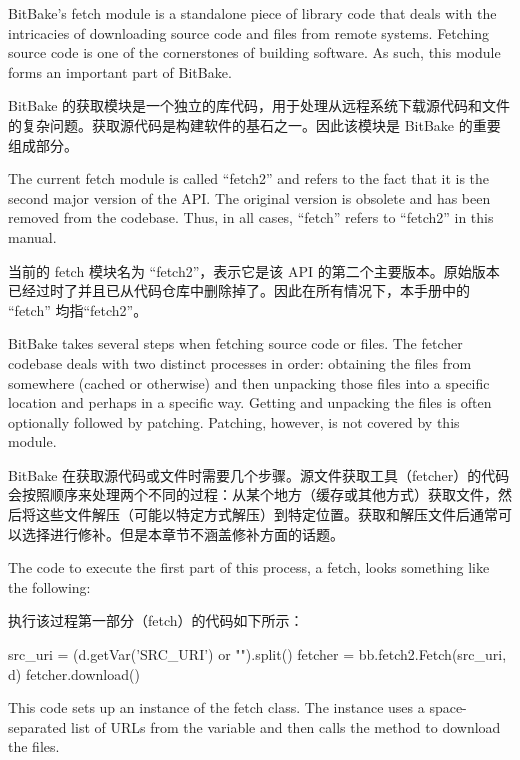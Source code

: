 
BitBake's fetch module is a standalone piece of library code that deals with the intricacies of downloading source code and files from remote systems. Fetching source code is one of the cornerstones of building software. As such, this module forms an important part of BitBake.

BitBake 的获取模块是一个独立的库代码，用于处理从远程系统下载源代码和文件的复杂问题。获取源代码是构建软件的基石之一。因此该模块是 BitBake 的重要组成部分。

The current fetch module is called ``fetch2'' and refers to the fact that it is the second major version of the API. The original version is obsolete and has been removed from the codebase. Thus, in all cases, ``fetch'' refers to ``fetch2'' in this manual.

当前的 fetch 模块名为 ``fetch2''，表示它是该 API 的第二个主要版本。原始版本已经过时了并且已从代码仓库中删除掉了。因此在所有情况下，本手册中的 ``fetch'' 均指``fetch2''。


BitBake takes several steps when fetching source code or files. The fetcher codebase deals with two distinct processes in order: obtaining the files from somewhere (cached or otherwise) and then unpacking those files into a specific location and perhaps in a specific way. Getting and unpacking the files is often optionally followed by patching. Patching, however, is not covered by this module.

BitBake 在获取源代码或文件时需要几个步骤。源文件获取工具\footnotemark[1]（fetcher）的代码会按照顺序来处理两个不同的过程：从某个地方（缓存或其他方式）获取文件，然后将这些文件解压（可能以特定方式解压）到特定位置。获取和解压文件后通常可以选择进行修补。但是本章节不涵盖修补方面的话题。


The code to execute the first part of this process, a fetch, looks something like the following:

执行该过程第一部分（fetch）的代码如下所示：

\begin{pyglist}
src_uri = (d.getVar('SRC_URI') or "").split()
fetcher = bb.fetch2.Fetch(src_uri, d)
fetcher.download()
\end{pyglist}

This code sets up an instance of the fetch class. The instance uses a space-separated list of URLs from the  variable and then calls the  method to download the files.

